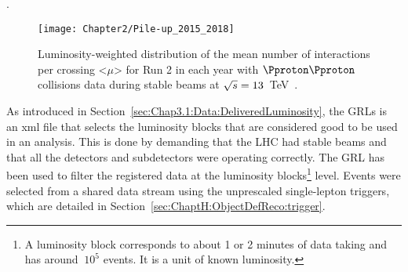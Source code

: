 \begin{table}[h]
\centering
{}
\caption{Peak luminosity, integrated luminosity delivered by the LHC and 
cumulative luminosity collected by the ATLAS detector at $\CM = 13\,$TeV during Run 2 per year~\cite{ATLAS:CONF:2019:021}}. 
\label{tab:ChaptH:Data:lumi}
\end{table}

\begin{figure}[h]
	\centering
 	 \texttt{[image: Chapter2/Pile-up\_2015\_2018]}
	 \caption{Luminosity-weighted distribution of the mean number of interactions 
	 per crossing <$\mu$> for Run 2 in each year with $\Pproton \Pproton$ collisions data during stable beams at $\sqrt{s}=13$~TeV~\cite{ATLAS:2022hro}.}
	\label{fig:Chap6:LHC:PileUp_15-18}
\end{figure}

As introduced in Section~\ref{sec:Chap3.1:Data:DeliveredLuminosity}, the GRLs is an xml file that selects the luminosity blocks that are considered good
to be used in an analysis. This is done by demanding that the LHC had stable beams and that all
the detectors and subdetectors were operating correctly.
The GRL has been used to filter the registered data at the luminosity blocks\footnote{A
luminosity block corresponds to about 1 or 2 minutes of data taking and has around $~10^{5}$ events. 
It is a unit of known luminosity.} level. %
Events were selected from a shared data stream using the unprescaled single-lepton triggers, 
which are detailed in Section~\ref{sec:ChaptH:ObjectDefReco:trigger}.


